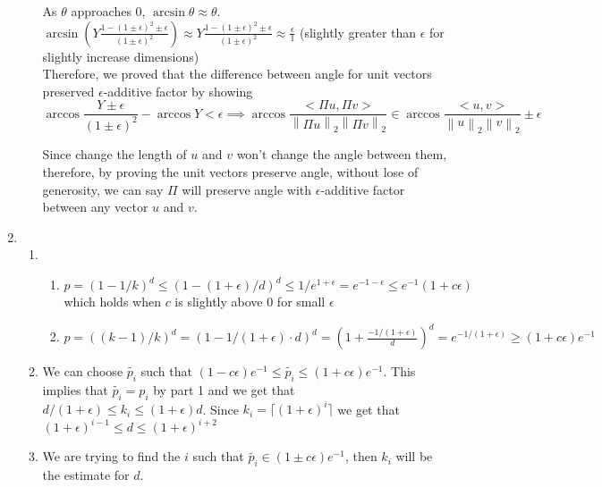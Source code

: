 \documentclass[11pt]{article}%
\newcommand{\norm}[1]{\left\lVert#1\right\rVert}
\begin{document}
\begin{questions}[1]
\begin{enumerate}
\begin{enumerate}
                As $\theta$ approaches $0$, $\arcsin{\theta} \approx \theta$. $\arcsin(Y\frac{1 - (1\pm\epsilon)^2 \pm \epsilon}{(1\pm\epsilon)^2}) \approx Y\frac{1 - (1\pm\epsilon)^2 \pm \epsilon}{(1\pm\epsilon)^2} \approx \frac{\epsilon}{1}$ (slightly greater than $\epsilon$ for slightly increase dimensions)\\ 
                
                Therefore, we proved that the difference between angle for unit vectors preserved $\epsilon$-additive factor by showing 
                $$ \arccos{\frac{Y\pm\epsilon}{(1\pm\epsilon)^2}} - \arccos{Y} < \epsilon \implies \arccos\frac{<\Pi u, \Pi v>}{\norm{\Pi u}_2\norm{\Pi v}_2} \in \arccos\frac{<u, v>}{\norm{u}_2\norm{v}_2} \pm\epsilon$$

                Since change the length of $u$ and $v$ won't change the angle between them, therefore, by proving the unit vectors preserve angle, without lose of generosity, we can say $\Pi$ will preserve angle with $\epsilon$-additive factor between any vector $u$ and $v$. 
        \end{enumerate}
    \newpage
    \item
        \begin{enumerate}
            \item 
                \begin{enumerate}
                    \item $ p = (1 - 1/k)^d \leq (1 - (1 + \epsilon)/d)^d \leq 1/e^{1 + \epsilon} = e^{-1-\epsilon} \leq e^{-1}(1+ c \epsilon)$ which holds when $c$ is slightly above 0 for small $\epsilon$

                \item $ p = ((k-1)/k)^d = (1 - 1/(1 + \epsilon)\cdot d)^d = (1 + \frac{-1/(1+\epsilon)}{d})^d = e^{-1/(1+\epsilon)} \geq (1+c\epsilon)e^{-1}$ 
                \end{enumerate}
            \item
                We can choose $\tilde{p_i}$ such that $(1 - c \epsilon)e^{-1}  \leq \tilde{p_i} \leq (1 + c \epsilon)e^{-1}$. This implies that $\tilde{p_i} = p_i$ by part 1 and we get that $d/(1 + \epsilon) \leq k_i \leq (1 + \epsilon) d$. Since $k_i = \lceil (1 + \epsilon)^i \rceil$ we get that $(1 + \epsilon)^{i -1} \leq d \leq (1 + \epsilon)^{i+ 2}$
            \item We are trying to find the $i$ such that $\tilde{p_i} \in (1 \pm c\epsilon)e^{-1}$, then $k_i$ will be the estimate for $d$.
    

\end{enumerate}
\end{enumerate}
\end{questions}
\end{document}
